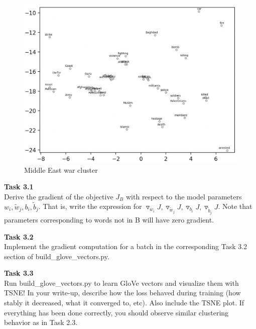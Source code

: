 \documentclass[12pt,article]{article}
\newenvironment{task}[2][Task]
    { \begin{mdframed}[backgroundcolor=gray!20] \textbf{#1 #2} \\}
    {  \end{mdframed}}
\begin{document}
\begin{figure}[H]
    \centering
    \includegraphics[scale=0.6]{middleeast_war.png} \par
    \caption{Middle East war cluster}
    \label{fig:q2-middle-east}
\end{figure}

\newpage
\begin{task}{3.1}
Derive the gradient of the objective $J_B$ with respect to the model parameters $w_i, \widetilde{w}_j, b_i, \widetilde{b}_j$. That is, write the expression for $\triangledown_{w_i}J, \triangledown_{\widetilde{w}_j}J, \triangledown_{b_i}J, \triangledown_{\widetilde{b}_j}J$. Note that parameters corresponding to words not in B will have zero gradient.
\end{task}

\begin{task}{3.2} 
Implement the gradient computation for a batch in the corresponding Task 3.2 section of build\_glove\_vectors.py.
\end{task}

\begin{task}{3.3} 
Run build\_glove\_vectors.py to learn GloVe vectors and visualize them with TSNE! In your write-up, describe how the loss behaved during training (how stably it decreased, what it converged to, etc). Also include the TSNE plot. If everything has been done correctly, you should observe similar clustering behavior as in Task 2.3.
\end{task}
\end{document}
